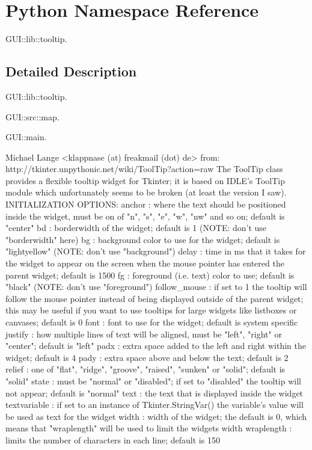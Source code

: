\hypertarget{namespace_python}{}\section{Python Namespace Reference}
\label{namespace_python}


G\+U\+I\+::lib\+::tooltip.  




\subsection{Detailed Description}
G\+U\+I\+::lib\+::tooltip. 

G\+U\+I\+::src\+::map.

G\+U\+I\+::main.

\begin{DoxyVerb}Michael Lange <klappnase (at) freakmail (dot) de>
from: http://tkinter.unpythonic.net/wiki/ToolTip?action=raw
The ToolTip class provides a flexible tooltip widget for Tkinter; it is based on IDLE's ToolTip
module which unfortunately seems to be broken (at least the version I saw).
INITIALIZATION OPTIONS:
anchor :        where the text should be positioned inside the widget, must be on of "n", "s", "e", "w", "nw" and so on;
default is "center"
bd :            borderwidth of the widget; default is 1 (NOTE: don't use "borderwidth" here)
bg :            background color to use for the widget; default is "lightyellow" (NOTE: don't use "background")
delay :         time in ms that it takes for the widget to appear on the screen when the mouse pointer has
entered the parent widget; default is 1500
fg :            foreground (i.e. text) color to use; default is "black" (NOTE: don't use "foreground")
follow_mouse :  if set to 1 the tooltip will follow the mouse pointer instead of being displayed
outside of the parent widget; this may be useful if you want to use tooltips for
large widgets like listboxes or canvases; default is 0
font :          font to use for the widget; default is system specific
justify :       how multiple lines of text will be aligned, must be "left", "right" or "center"; default is "left"
padx :          extra space added to the left and right within the widget; default is 4
pady :          extra space above and below the text; default is 2
relief :        one of "flat", "ridge", "groove", "raised", "sunken" or "solid"; default is "solid"
state :         must be "normal" or "disabled"; if set to "disabled" the tooltip will not appear; default is "normal"
text :          the text that is displayed inside the widget
textvariable :  if set to an instance of Tkinter.StringVar() the variable's value will be used as text for the widget
width :         width of the widget; the default is 0, which means that "wraplength" will be used to limit the widgets width
wraplength :    limits the number of characters in each line; default is 150


\end{DoxyVerb}
